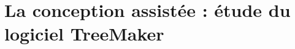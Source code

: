 \documentclass[a4paper,12pt,french]{report}
\begin{document}




\chapter{La conception assistée : étude du logiciel TreeMaker}
\end{document}
